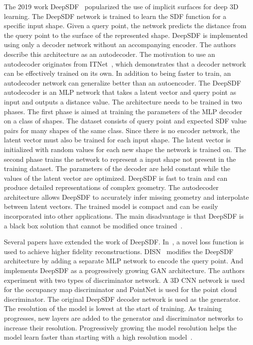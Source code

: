 The 2019 work DeepSDF~\cite{Park2019} popularized the use of implicit surfaces for deep 3D learning. The DeepSDF network is trained to learn the SDF function for a specific input shape. Given a query point, the network predicts the distance from the query point to the surface of the represented shape. DeepSDF is implemented using only a decoder network without an accompanying encoder. The authors describe this architecture as an autodecoder. The motivation to use an autodecoder originates from ITNet~\cite{Tan1995}, which demonstrates that a decoder network can be effectively trained on its own. In addition to being faster to train, an autodecoder network can generalize better than an autoencoder. The DeepSDF autodecoder is an MLP network that takes a latent vector and query point as input and outputs a distance value. The architecture needs to be trained in two phases. The first phase is aimed at training the parameters of the MLP decoder on a class of shapes. The dataset consists of query point and expected SDF value pairs for many shapes of the same class. Since there is no encoder network, the latent vector must also be trained for each input shape. The latent vector is initialized with random values for each new shape the network is trained on. The second phase trains the network to represent a  input shape not present in the training dataset. The parameters of the decoder are held constant while the values of the latent vector are optimized. DeepSDF is fast to train and can produce detailed representations of complex geometry. The autodecoder architecture allows DeepSDF to accurately infer missing geometry and interpolate between latent vectors. The trained model is compact and can be easily incorporated into other applications. The main disadvantage is that DeepSDF is a black box solution that cannot be modified once trained~\cite{Park2019}.

Several papers have extended the work of DeepSDF. In~\cite{Gropp2020}, a novel loss function is used to achieve higher fidelity reconstructions. DISN~\cite{Wang2019} modifies the DeepSDF architecture by adding a separate MLP network to encode the query point. And \cite{Kleineberg2020} implements DeepSDF as a progressively growing GAN architecture. The authors experiment with two types of discriminator network. A 3D CNN network is used for the occupancy map discriminator and PointNet is used for the point cloud discriminator. The original DeepSDF decoder network is used as the generator. The resolution of the model is lowest at the start of training. As training progresses, new layers are added to the generator and discriminator networks to increase their resolution. Progressively growing the model resolution helps the model learn faster than starting with a high resolution model~\cite{Kleineberg2020}.

